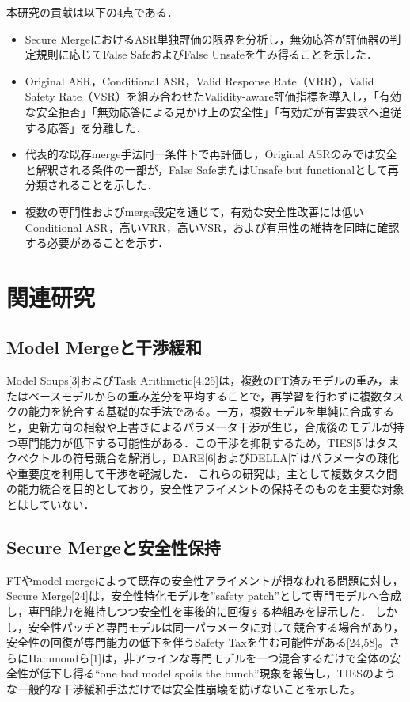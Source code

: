 \documentclass{article}
\begin{document}
本研究の貢献は以下の4点である．
\begin{itemize}
    \item Secure MergeにおけるASR単独評価の限界を分析し，無効応答が評価器の判定規則に応じてFalse SafeおよびFalse Unsafeを生み得ることを示した．
    \item Original ASR，Conditional ASR，Valid Response Rate（VRR），Valid Safety Rate（VSR）を組み合わせたValidity-aware評価指標を導入し，「有効な安全拒否」「無効応答による見かけ上の安全性」「有効だが有害要求へ追従する応答」を分離した．
    \item 代表的な既存merge手法同一条件下で再評価し，Original ASRのみでは安全と解釈される条件の一部が，False SafeまたはUnsafe but functionalとして再分類されることを示した．
    \item 複数の専門性およびmerge設定を通じて，有効な安全性改善には低いConditional ASR，高いVRR，高いVSR，および有用性の維持を同時に確認する必要があることを示す．
\end{itemize}

\section{関連研究}
\subsection{Model Mergeと干渉緩和}
Model Soups[3]およびTask Arithmetic[4,25]は，複数のFT済みモデルの重み，またはベースモデルからの重み差分を平均することで，再学習を行わずに複数タスクの能力を統合する基礎的な手法である。一方，複数モデルを単純に合成すると，更新方向の相殺や上書きによるパラメータ干渉が生じ，合成後のモデルが持つ専門能力が低下する可能性がある．この干渉を抑制するため，TIES[5]はタスクベクトルの符号競合を解消し，DARE[6]およびDELLA[7]はパラメータの疎化や重要度を利用して干渉を軽減した．
これらの研究は，主として複数タスク間の能力統合を目的としており，安全性アライメントの保持そのものを主要な対象とはしていない．

\subsection{Secure Mergeと安全性保持}
FTやmodel mergeによって既存の安全性アライメントが損なわれる問題に対し，Secure Merge[24]は，安全性特化モデルを''safety patch''として専門モデルへ合成し，専門能力を維持しつつ安全性を事後的に回復する枠組みを提示した．
しかし，安全性パッチと専門モデルは同一パラメータに対して競合する場合があり，安全性の回復が専門能力の低下を伴うSafety Taxを生む可能性がある[24,58]。さらにHammoudら[1]は，非アラインな専門モデルを一つ混合するだけで全体の安全性が低下し得る``one bad model spoils the bunch''現象を報告し，TIESのような一般的な干渉緩和手法だけでは安全性崩壊を防げないことを示した。
\end{document}
